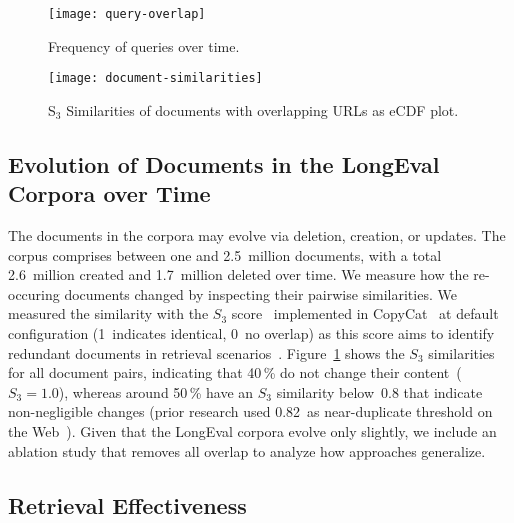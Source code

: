\begin{figure}[t]
    \begin{minipage}{.49\textwidth}
        \texttt{[image: query-overlap]}
        \vspace{-4ex}
        \caption{Frequency of queries over time.}
        \label{fig:query-overlap}
    \end{minipage}
    \hfill    
    \begin{minipage}{.49\textwidth}
        \texttt{[image: document-similarities]}
        \vspace{-4ex}
        \caption{S$_{3}$ Similarities of documents with overlapping URLs as eCDF plot.}
        \label{fig:document-similarities}
    \end{minipage}
\end{figure}

\subsection{Evolution of Documents in the LongEval Corpora over Time}

The documents in the corpora may evolve via deletion, creation, or updates. The corpus comprises between one and 2.5~million documents, with a total 2.6~million created and 1.7~million deleted over time. We measure how the re-occuring documents changed by inspecting their pairwise similarities. We measured the similarity with the $S_{3}$ score~\cite{bernstein:2005} implemented in CopyCat~\cite{froebe:2021a} at default configuration (1~indicates identical, 0~no overlap) as this score aims to identify redundant documents in retrieval scenarios~\cite{bernstein:2005}. Figure~\ref{fig:document-similarities} shows the $S_{3}$ similarities for all document pairs, indicating that 40\,\% do not change their content~($S_{3}=1.0$), whereas around 50\,\% have an $S_{3}$ similarity below~0.8 that indicate non-negligible changes (prior research used 0.82~as near-duplicate threshold on the Web~\cite{froebe:2021a}). Given that the LongEval corpora evolve only slightly, we include an ablation study that removes all overlap to analyze how approaches generalize.



\enlargethispage*{2\baselineskip}
\subsection{Retrieval Effectiveness}



